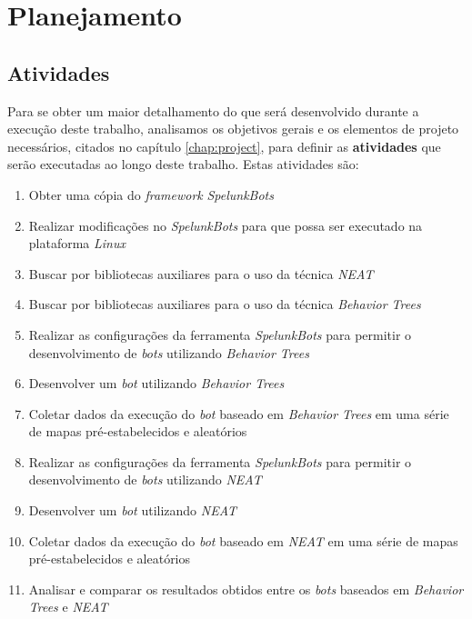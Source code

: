 \chapter{\label{chap:work-plan}Planejamento}


\section{\label{section:work-plan-activities}Atividades}
Para se obter um maior detalhamento do que será desenvolvido durante a execução
deste trabalho, analisamos os objetivos gerais e os elementos de projeto
necessários, citados no capítulo \ref{chap:project}, para definir as
\textbf{atividades} que serão executadas ao longo deste trabalho. Estas
atividades são:

\begin{enumerate}
	\item
		Obter uma cópia do \textit{framework} \textit{SpelunkBots}
	\item
		Realizar modificações no \textit{SpelunkBots} para que possa ser
		executado na plataforma \textit{Linux}
	\item
		Buscar por bibliotecas auxiliares para o uso da técnica \textit{NEAT}
	\item
		Buscar por bibliotecas auxiliares para o uso da técnica \textit{Behavior
		Trees}
	\item
		Realizar as configurações da ferramenta \textit{SpelunkBots} para
		permitir o desenvolvimento de \textit{bots} utilizando \textit{Behavior
		Trees}
	\item
		Desenvolver um \textit{bot} utilizando \textit{Behavior Trees}
	\item
		Coletar dados da execução do \textit{bot} baseado em \textit{Behavior
		Trees} em uma série de mapas pré-estabelecidos e aleatórios
	\item
		Realizar as configurações da ferramenta \textit{SpelunkBots} para
		permitir o desenvolvimento de \textit{bots} utilizando \textit{NEAT}
	\item
		Desenvolver um \textit{bot} utilizando \textit{NEAT}
	\item
		Coletar dados da execução do \textit{bot} baseado em \textit{NEAT} em
		uma série de mapas pré-estabelecidos e aleatórios
	\item
		Analisar e comparar os resultados obtidos entre os \textit{bots}
		baseados em \textit{Behavior Trees} e \textit{NEAT}
\end{enumerate}


